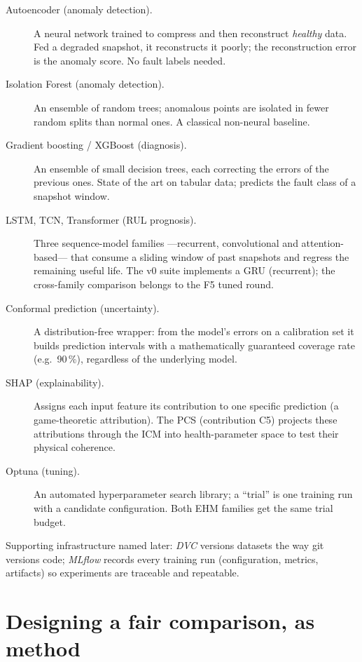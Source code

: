 \begin{description}
  \item[Autoencoder (anomaly detection).] A neural network trained to compress and then
    reconstruct \emph{healthy} data. Fed a degraded snapshot, it reconstructs it poorly; the
    reconstruction error is the anomaly score. No fault labels needed.
  \item[Isolation Forest (anomaly detection).] An ensemble of random trees; anomalous points
    are isolated in fewer random splits than normal ones. A classical non-neural baseline.
  \item[Gradient boosting / XGBoost (diagnosis).] An ensemble of small decision trees, each
    correcting the errors of the previous ones. State of the art on tabular data; predicts the
    fault class of a snapshot window.
  \item[LSTM, TCN, Transformer (RUL prognosis).] Three sequence-model families ---recurrent,
    convolutional and attention-based--- that consume a sliding window of past snapshots and
    regress the remaining useful life. The v0 suite implements a GRU (recurrent); the
    cross-family comparison belongs to the F5 tuned round.
  \item[Conformal prediction (uncertainty).] A distribution-free wrapper: from the model's
    errors on a calibration set it builds prediction intervals with a mathematically
    guaranteed coverage rate (e.g.\ 90\,\%), regardless of the underlying model.
  \item[SHAP (explainability).] Assigns each input feature its contribution to one specific
    prediction (a game-theoretic attribution). The PCS (contribution C5) projects these
    attributions through the ICM into health-parameter space to test their physical coherence.
  \item[Optuna (tuning).] An automated hyperparameter search library; a ``trial'' is one
    training run with a candidate configuration. Both EHM families get the same trial budget.
\end{description}

Supporting infrastructure named later: \emph{DVC} versions datasets the way git versions code;
\emph{MLflow} records every training run (configuration, metrics, artifacts) so experiments
are traceable and repeatable.

\section{Designing a fair comparison, as method}
\label{sec:fair-design}

